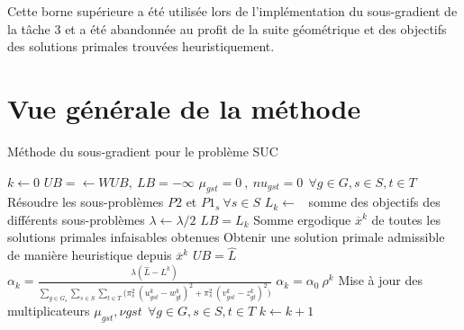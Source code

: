 Cette borne supérieure a été utilisée lors de l'implémentation du sous-gradient de la tâche 3 et a été abandonnée au profit de la suite géométrique et
des objectifs des solutions primales trouvées heuristiquement.

\section{Vue générale de la méthode}

\begin{algorithm}[H]
\caption{Méthode du sous-gradient pour le problème SUC}
\begin{algorithmic}[1]
\State $k \leftarrow 0$
\State $UB = \leftarrow WUB, \ LB = -\infty$ 
\State $\mu_{gst} = 0 \ , \ nu_{gst} = 0 \ \ \forall g \in G, s \in S, t \in T$
\State Résoudre les sous-problèmes $P2$ et $P1_s \ \forall s \in S$
\State $L_k \leftarrow $ \ somme des objectifs des différents sous-problèmes
\State $\lambda \leftarrow \lambda / 2$
\EndIf
{}
\State $LB = L_k$
\EndIf
{}
\State Somme ergodique $\overline{x}^k$ de toutes les solutions primales infaisables obtenues
\State Obtenir une solution primale admissible de manière heuristique depuis $\overline{x}^k$
\EndIf
{}
\State $UB = \hat{L}$
\EndIf
{}
\State $\alpha_k = \frac{\lambda (\hat{L} - L^k)}{\sum\limits_{g \in G_s} \sum\limits_{s \in S} \sum\limits_{t \in T} \big(\pi_s^2 \ (u_{gst}^k - w_{gt}^k)^2 + \pi_s^2 \ (v_{gst}^k - z_{gt}^k)^2\big)}$
\Else
\State $\alpha_k = \alpha_0 \ \rho^k$
\EndIf
\State Mise à jour des multiplicateurs $\mu_{gst}, \nu{gst} \ \ \forall g \in G, s \in S, t \in T$
\State $k \leftarrow k + 1$
\EndWhile
\EndProcedure
\end{algorithmic}
\end{algorithm}